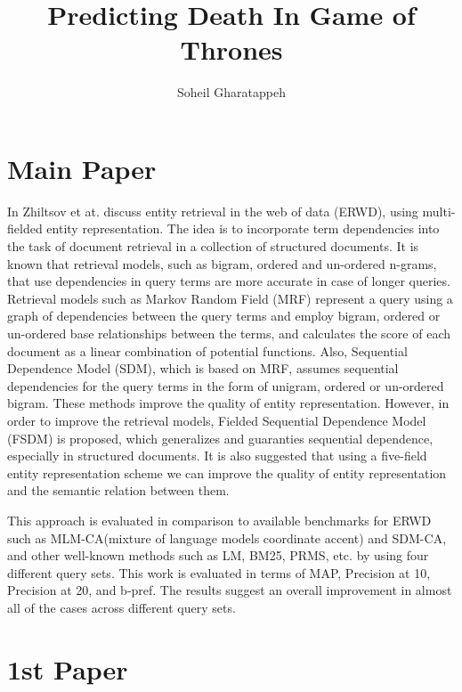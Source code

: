 \documentclass[letterpaper]{article}
\title{Predicting Death In Game of Thrones}
\author{Soheil Gharatappeh}
\begin{document}
\maketitle
	
	


\section{Main Paper}

In \cite{openie} Zhiltsov et at. discuss entity retrieval in the web of data (ERWD), using multi-fielded entity representation. The idea is to incorporate term dependencies into the task of document retrieval in a collection of structured documents. It is known that retrieval models, such as bigram, ordered and un-ordered n-grams, that use dependencies in query terms are more accurate in case of longer queries. Retrieval models such as Markov Random Field (MRF) represent a query using a graph of dependencies between the query terms and employ bigram, ordered or un-ordered base relationships between the terms, and calculates the score of each document as a linear combination of potential functions. Also, Sequential Dependence Model (SDM), which is based on MRF, assumes sequential dependencies for the query terms in the form of unigram, ordered or un-ordered bigram. These methods improve the quality of entity representation. However, in order to improve the retrieval models, Fielded Sequential Dependence Model (FSDM) is proposed, which generalizes and guaranties sequential dependence, especially in structured documents. It is also suggested that using a five-field entity representation scheme we can improve the quality of entity representation and the semantic relation between them.

This approach is evaluated in comparison to available benchmarks for ERWD such as MLM-CA(mixture of language models coordinate accent) and SDM-CA, and other well-known methods such as LM, BM25, PRMS, etc. by using four different query sets. This work is evaluated in terms of MAP, Precision at 10, Precision at 20, and b-pref. The results suggest an overall improvement in almost all of the cases across different query sets.


\section{1st Paper}
\end{document}
